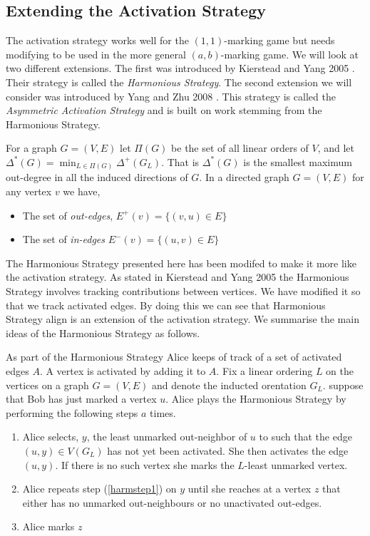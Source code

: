 \subsection{Extending the Activation Strategy}

The activation strategy works well for the $(1,1)$-marking game but needs modifying to be used in the more general $(a,b)$-marking game. We will look at two different extensions. The first was introduced by Kierstead and Yang 2005 \cite{kierYang2005}. Their strategy is called the \textit{Harmonious Strategy}. The second extension we will consider was introduced by Yang and Zhu 2008 \cite{yangZhu2008}. This strategy is called the \textit{Asymmetric Activation Strategy} and is built on work stemming from the Harmonious Strategy. 

For a graph $G=(V,E)$ let $\Pi(G)$ be the set of all linear orders of $V$, and let $\Delta^*(G)=\min_{L\in \Pi(G)}\Delta^+(G_L)$. That is $\Delta^*(G)$ is the smallest maximum out-degree in all the induced directions of $G$. 
In a directed graph $G=(V,E)$ for any vertex $v$ we have, 
\begin{itemize}
    \item The set of \textit{out-edges}, $E^+(v) =\{(v,u)\in E\}$
    \item The set of \textit{in-edges} $E^-(v) =\{(u,v)\in E\}$ 
\end{itemize}  

The Harmonious Strategy presented here has been modifed to make it more like the activation strategy. As stated in Kierstead and Yang 2005 \cite{kierYang2005} the Harmonious Strategy involves tracking contributions between vertices. We have modified it so that we track activated edges. By doing this we can see that Harmonious Strategy align is an extension of the activation strategy. We summarise the main ideas of the Harmonious Strategy as follows. 

As part of the Harmonious Strategy Alice keeps of track of a set of activated edges $A$. A vertex is activated by adding it to $A$.
Fix a linear ordering $L$ on the vertices on a graph $G=(V,E)$ and denote the inducted orentation $G_L$. suppose that Bob has just marked a vertex $u$. Alice plays the Harmonious Strategy by performing the following steps $a$ times.    
\begin{enumerate}
    \item  Alice selects, $y$, the least unmarked out-neighbor of $u$ to such that the edge $(u,y)\in V(G_L)$ has not yet been activated. She then activates the edge $(u,y)$. If there is no such vertex she marks the $L$-least unmarked vertex. \label{harmstep1}
    \item  Alice repeats step (\ref{harmstep1}) on $y$ until she reaches at a vertex $z$ that either has no unmarked out-neighbours or no unactivated out-edges. 
    \item  Alice marks $z$
\end{enumerate}

